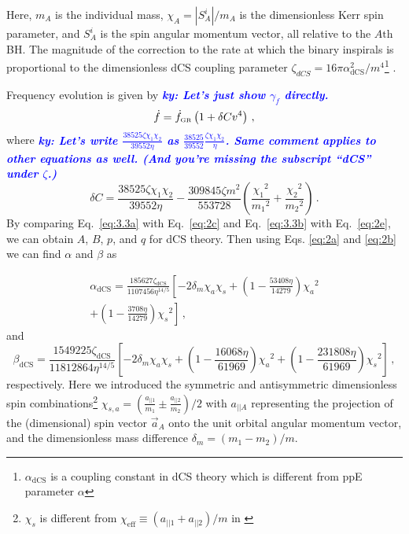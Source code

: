 \documentclass[prd,twocolumn,nofootinbib]{revtex4-1}
\newcommand{\GR}{{\mbox{\tiny GR}}}
\newcommand{\ky}[1]{\textcolor{blue}{\it{\textbf{ky: #1}}} }
\begin{document}
Here, $m_A$ is the individual mass, $\chi_A =\left | S_{A}^{i} \right |/m_A$ is the dimensionless Kerr spin parameter, and $S_{A}^{i}$ is the spin angular momentum vector, all relative to the $\mathit{A}\text{th}$ BH. The magnitude of the correction to the rate at which the binary inspirals is proportional to the dimensionless dCS coupling parameter $\zeta_{dCS}=16\pi \alpha_{\text{dCS}}^2/m^4$\footnote{$\alpha_{\text{dCS}}$ is a coupling constant in dCS theory which is different from ppE parameter $\alpha$} .


Frequency evolution is given by \cite{Yagi:2012vf} \ky{Let's just show $\gamma_{\dot f}$ directly.}
\begin{equation}\label{eq:3.3b}
\dot{f}=\dot{f}_{\GR}\left(1+\delta C v^4\right)\,,
\end{equation}
 where \ky{Let's write $\frac{38525 \zeta \chi_1 \chi_2}{39552 \eta }$ as $\frac{38525}{39552} \frac{\zeta \chi_1 \chi_2}{\eta}$. Same comment applies to other equations as well. (And you're missing the subscript ``dCS'' under $\zeta$.)}
 \begin{equation}
 \delta C= \frac{38525 \zeta \chi_1 \chi_2}{39552 \eta }-\frac{309845 \zeta  m^2 }{553728 }\left(\frac{{\chi_1}^2}{{m_1}^2}+\frac{{\chi_2}^2}{{m_2}^2}\right)\,.
 \end{equation}
 By comparing Eq.~\eqref{eq:3.3a} with Eq.~\eqref{eq:2c} and Eq.~\eqref{eq:3.3b} with Eq.~\eqref{eq:2e}, we can obtain $A$, $B$, $p$,  and $q$ for dCS theory. Then using Eqs. \eqref{eq:2a} and \eqref{eq:2b} we can find $\alpha$ and $\beta$ as
 
 \begin{align}
 \alpha_{\text{dCS}}=\frac{185627 \zeta_{\text{dCS}} }{1107456 \eta ^{14/5}}\left[-2 \text{$\delta_m$} \text{$\chi_a$} \text{$\chi_s$}+\left(1-\frac{53408 \eta }{14279}\right) \text{$\chi_a$}^2\right. \nonumber\\ \left.+\left(1-\frac{3708 \eta }{14279}\right) \text{$\chi_s$}^2\right]\,,
 \end{align}
 and
 \begin{equation}
 \beta_{\text{dCS}}=\frac{1549225 \zeta_{\text{dCS}} }{11812864 \eta ^{14/5}}\left[-2 \text{$\delta_m$} \text{$\chi_a$} \text{$\chi_s$}+\left(1-\frac{16068 \eta }{61969}\right) \text{$\chi_a$}^2+\left(1-\frac{231808 \eta }{61969}\right) \text{$\chi_s$}^2\right]\,,
 \end{equation}
 respectively. Here we introduced the symmetric and antisymmetric dimensionless spin combinations\footnote{$\chi_s$ is different from $\chi_{\text{eff}}\equiv (a_{||1}+a_{||2})/m$ in \cite{TheLIGOScientific:2016wfe}} $\chi_{s,a}=(\frac{a_{||1}}{m_1}\pm\frac{a_{||2}}{m_2})/2$ with $a_{||A}$ representing the projection of the (dimensional) spin vector $\vec{a}_A$ onto the unit orbital angular momentum vector, and the dimensionless mass difference $\delta_m=(m_1-m_2)/m$.
 
\end{document}
